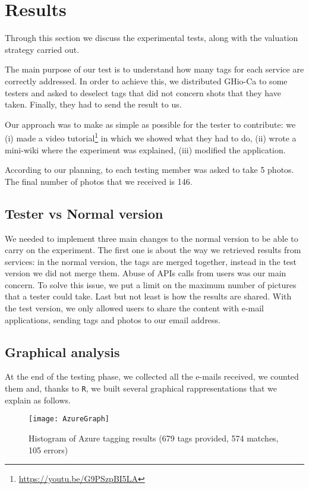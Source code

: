 \section{Results}
\label{sec:results}

Through this section we discuss the experimental tests, along with the valuation strategy carried out. 

The main purpose of our test is to understand how many tags for each service are correctly addressed. In order to achieve this, we distributed GHio-Ca to some testers and asked to deselect tags that did not concern shots that they have taken. Finally, they had to send the result to us.

Our approach was to make as simple as possible for the tester to contribute: we (i) made a video tutorial\footnote{\url{https://youtu.be/G9PSzpBI5LA}} in which we showed what they had to do, (ii) wrote a mini-wiki where the experiment was explained, (iii) modified the application. 

According to our planning, to each testing member was asked to take 5 photos. The final number of photos that we received is 146.

\subsection{Tester vs Normal version}

We needed to implement three main changes to the normal version to be able to carry on the experiment. The first one is about the way we retrieved results from services: in the normal version, the tags are merged together, instead in the test version we did not merge them.
Abuse of APIs calls from users was our main concern. To solve this issue, we put a limit on the maximum number of pictures that a tester could take.
Last but not least is how the results are shared. With the test version, we only allowed users to share the content with e-mail applications, sending tags and photos to our email address.


\subsection{Graphical analysis}

At the end of the testing phase, we collected all the e-mails received, we counted them and, thanks to \texttt{R}, we built several graphical rappresentations that we explain as follows.

\begin{figure}[H]
\centering
\texttt{[image: AzureGraph]}
\caption{Histogram of Azure tagging results (679 tags provided, 574 matches, 105 errors)}
\label{img:testgraphsazure}
\end{figure}

